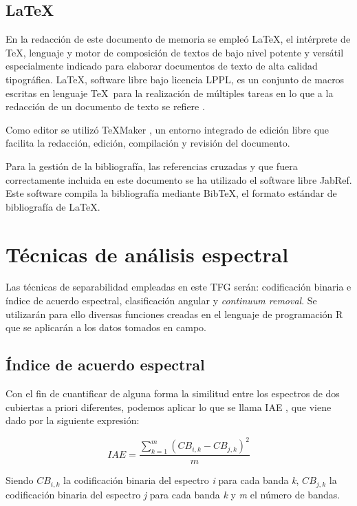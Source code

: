 \subsection{\LaTeX}
En la redacción de este documento de memoria se empleó \LaTeX, el intérprete de \TeX, lenguaje y motor de composición de textos de bajo nivel potente y versátil especialmente indicado para elaborar documentos de texto de alta calidad tipográfica. \LaTeX, software libre bajo licencia LPPL, es un conjunto de macros escritas en lenguaje \TeX\ para la realización de múltiples tareas en lo que a la redacción de un documento de texto se refiere \citep{Latex2011} \citep{galindo2001} \citep{lamport1994}.\Sep

Como editor se utilizó TeXMaker \citep{Brachet2003}, un entorno integrado de edición libre que facilita la redacción, edición, compilación y revisión del documento.\Sep

Para la gestión de la bibliografía, las referencias cruzadas y que fuera correctamente incluida en este documento se ha utilizado el software libre JabRef. Este software compila la bibliografía mediante BibTeX, el formato estándar de bibliografía de \LaTeX.

\section{Técnicas de análisis espectral} \label{sec:tecnicas}
Las técnicas de separabilidad empleadas en este \ac{TFG} serán: codificación binaria e índice de acuerdo espectral, clasificación angular y \textit{continuum removal}. Se utilizarán para ello diversas funciones creadas en el lenguaje de programación R que se aplicarán a los datos tomados en campo.

\subsection{Índice de acuerdo espectral}
Con el fin de cuantificar de alguna forma la similitud entre los espectros de dos cubiertas a priori diferentes, podemos aplicar lo que se llama \ac{IAE} \citep{chuvieco2002teledeteccion}, que viene dado por la siguiente expresión:

\begin{equation} \label{eq:IAE}
	IAE = \frac{\displaystyle\sum_{k=1}^m(CB_{i,k} - CB_{j,k})^{2}}{m}
\end{equation}\Sep

Siendo $CB_{i,k}$ la codificación binaria del espectro \textit{i} para cada banda \textit{k}, $CB_{j,k}$ la codificación binaria del espectro \textit{j} para cada banda \textit{k} y \textit{m} el número de bandas.\Sep

